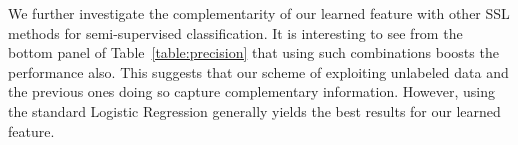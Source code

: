 \documentclass[preprint,12pt,3p]{elsarticle}
\begin{document}
We further investigate the complementarity of our learned feature with
other SSL methods for semi-supervised classification. It is
interesting to see from the bottom panel of
Table~\ref{table:precision} that using such combinations boosts the
performance also. This suggests that our scheme of exploiting
unlabeled data and the previous ones doing so capture complementary
information. However, using the standard Logistic Regression generally
yields the best results for our learned feature.

 




\end{document}
